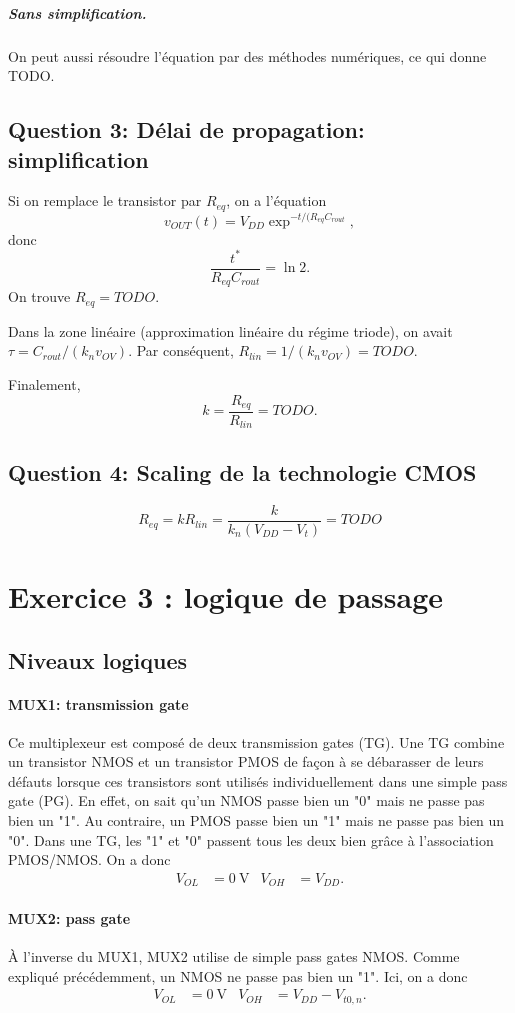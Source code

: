 \documentclass[frenchb,DIV=14]{scrartcl}
\begin{document}
\subparagraph{Sans simplification.} On peut aussi résoudre l'équation
par des méthodes numériques, ce qui donne TODO.

\subsection*{Question 3: Délai de propagation: simplification}

Si on remplace le transistor par $R_{eq}$, on a l'équation
\[v_{OUT}(t) = V_{DD} \exp^{-t/(R_{eq}C_{rout}},\]
donc \[\frac{t^*}{R_{eq}C_{rout}} = \ln 2.\]
On trouve $R_{eq} = TODO$.

Dans la zone linéaire (approximation linéaire du régime triode),
on avait $\tau = C_{rout} / (k_n v_{OV})$. Par conséquent,
$R_{lin} = 1 / (k_n v_{OV}) = TODO$.

Finalement,
\[k = \frac{R_{eq}}{R_{lin}} = TODO.\]

\subsection*{Question 4: Scaling de la technologie CMOS}

\[R_{eq} = k R_{lin} = \frac{k}{k_n (V_{DD} - V_t)} = TODO\]

\section*{Exercice 3 : logique de passage}
\subsection*{Niveaux logiques}
\paragraph{MUX1: transmission gate} 
Ce multiplexeur est composé de deux transmission gates (TG).
Une TG combine un transistor NMOS et un transistor PMOS de façon à se débarasser
de leurs défauts lorsque ces transistors sont utilisés individuellement dans une
simple pass gate (PG). En effet, on sait qu'un NMOS passe bien un "0" mais ne passe
pas bien un "1". Au contraire, un PMOS passe bien un "1" mais ne passe pas bien un "0".
Dans une TG, les "1" et "0" passent tous les deux bien grâce à l'association PMOS/NMOS.
On a donc
\begin{align*}
	V_{OL} &= \SI{0}{\volt} & V_{OH} &= V_{DD}.
\end{align*}

\paragraph{MUX2: pass gate} 
\`{A} l'inverse du MUX1, MUX2 utilise de simple pass gates NMOS.
Comme expliqué précédemment, un NMOS ne passe pas bien un "1". Ici, on a donc
\begin{align*}
	V_{OL} &= \SI{0}{\volt} & V_{OH} &= V_{DD}-V_{t0,n}.
\end{align*}
\end{document}
